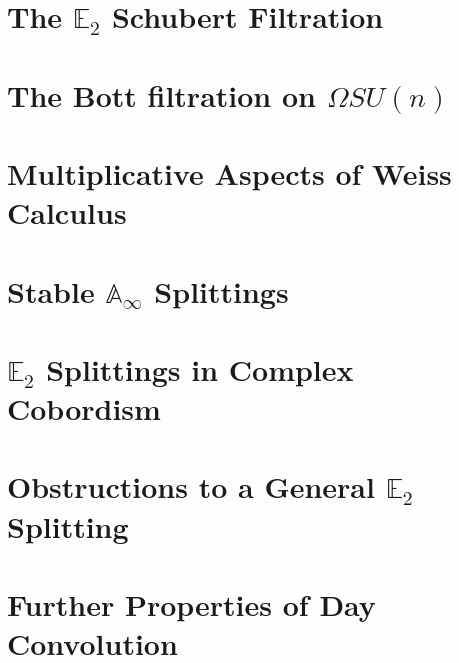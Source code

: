 \documentclass[reqno, oneside]{amsart}
\theoremstyle{definition}
\theoremstyle{plain}
\begin{document}


\section{The \texorpdfstring{$\mathbb{E}_2$}{E2} Schubert Filtration} \label{sec:Schubert}



\section{The Bott filtration on \texorpdfstring{$\Omega SU(n)$}{OmegaSU(n)}} \label{sec:MRFil}

 

\section{Multiplicative Aspects of Weiss Calculus} \label{sec:MultWeiss}



\section{Stable \texorpdfstring{$\mathbb{A}_\infty$}{Aoo} Splittings} \label{sec:AooSplit}



\section{\texorpdfstring{$\mathbb{E}_2$}{E2} Splittings in Complex Cobordism} \label{sec:MUE2}



\section{Obstructions to a General \texorpdfstring{$\mathbb{E}_2$}{E2} Splitting} \label{sec:Obstruction}



\appendix

\section{Further Properties of Day Convolution}\label{app:day}


\end{document}

